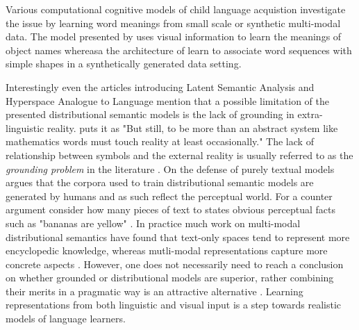 Various computational cognitive models of child language acquistion investigate the issue
by learning word meanings from small scale or synthetic multi-modal data. The model presented by
\cite{yu2005emergence} uses visual information to learn the meanings of object
names whereasa the architecture of \cite{roy2002learning} learn to associate word sequences
with simple shapes in a synthetically generated data setting.

Interestingly even the articles introducing Latent Semantic Analysis
\cite{landauer1997solution} and Hyperspace Analogue to Language \cite{lund1996producing} mention
that a possible limitation of the presented distributional semantic models is the lack of
grounding in extra-linguistic reality. \cite{landauer1997solution} puts it as "But still, to be more than
an abstract system like mathematics words must touch reality at least occasionally."
The lack of relationship between symbols and the external reality is usually referred
to as the \emph{grounding problem} in the literature \cite{harnad1990symbol,perfetti1998limits}.
On the defense of purely textual models \cite{louwerse2011symbol} argues that the corpora
used to train distributional semantic models are generated by humans and as such reflect the perceptual world.
For a counter argument consider how many pieces of text to states obvious perceptual
facts such as "bananas are yellow" \cite{bruni2014multimodal}.
In practice much work on multi-modal distributional semantics have found that text-only spaces tend to
represent more encyclopedic knowledge, whereas mutli-modal representations capture more concrete aspects
\cite{andrews2009integrating,baroni2008concepts}. However, one does not necessarily need to
reach a conclusion on whether grounded or distributional models are superior, rather combining their merits in a
pragmatic way is an attractive alternative \cite{riordan2011redundancy}. Learning representations
from both linguistic and visual input is a step towards realistic models of language learners.

